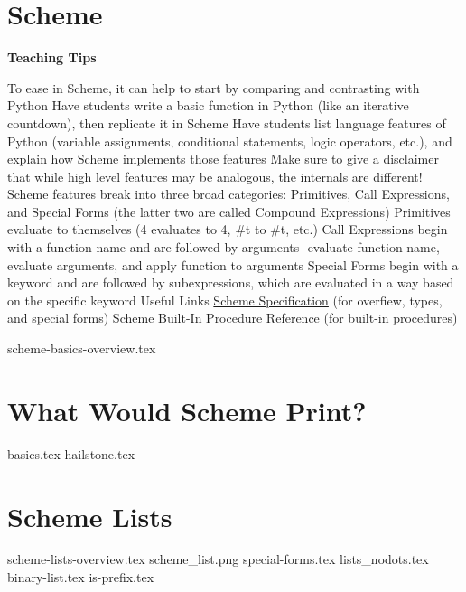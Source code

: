 \documentclass{exam}
\begin{document}
\section{Scheme}
\begin{guide}
\begin{blocksection}
\textbf{Teaching Tips}
\begin{outline}[enumerate]
    \1 To ease in Scheme, it can help to start by comparing and contrasting with Python
    \2 Have students write a basic function in Python (like an iterative countdown), then replicate it in Scheme
    \2 Have students list language features of Python (variable assignments, conditional statements, logic operators, etc.), and explain how Scheme implements those features
    \2 Make sure to give a disclaimer that while high level features may be analogous, the internals are different!
    \1 Scheme features break into three broad categories: Primitives, Call Expressions, and Special Forms (the latter two are called Compound Expressions)
    \2 Primitives evaluate to themselves (4 evaluates to 4, \#t to \#t, etc.)
    \2 Call Expressions begin with a function name and are followed by arguments- evaluate function name, evaluate arguments, and apply function to arguments
    \2 Special Forms begin with a keyword and are followed by subexpressions, which are evaluated in a way based on the specific keyword
    \1 Useful Links
    \2 \href{https://cs61a.org/articles/scheme-spec/}{Scheme Specification} (for overfiew, types, and special forms)
    \2 \href{https://cs61a.org/articles/scheme-builtins/}{Scheme Built-In Procedure Reference} (for built-in procedures)
\end{outline}
\end{blocksection}
\end{guide}

{scheme-basics-overview.tex}
\begin{questions}
\newpage
\section{What Would Scheme Print?}
{basics.tex}
{hailstone.tex}

\section{Scheme Lists}
{scheme-lists-overview.tex}
{scheme_list.png}
{special-forms.tex}
\newpage
{lists_nodots.tex}
{binary-list.tex}
{is-prefix.tex}

\end{questions}
\end{document}
